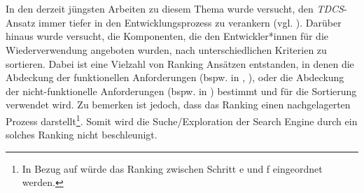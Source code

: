 \\\\
In den derzeit jüngsten Arbeiten zu diesem Thema wurde versucht, den \emph{TDCS}-Ansatz immer tiefer in den Entwicklungsprozess zu verankern (vgl. \cite{kessel2018}). Darüber hinaus wurde versucht, die Komponenten, die den Entwickler*innen für die Wiederverwendung angeboten wurden, nach unterschiedlichen Kriterien zu sortieren. Dabei ist eine Vielzahl von Ranking Ansätzen entstanden, in denen die Abdeckung der funktionellen Anforderungen (bspw. in \cite{STOLEE201635}, \cite{kessel2015}), oder die Abdeckung der nicht-funktionelle Anforderungen (bspw. in \cite{kessel2016}) bestimmt und für die Sortierung verwendet wird. Zu bemerken ist jedoch, dass das Ranking  einen nachgelagerten Prozess darstellt\footnote{In Bezug auf  würde das Ranking zwischen Schritt e und f eingeordnet werden.}. Somit wird die Suche/Exploration der Search \Gls{Engine} durch ein solches Ranking nicht beschleunigt.

